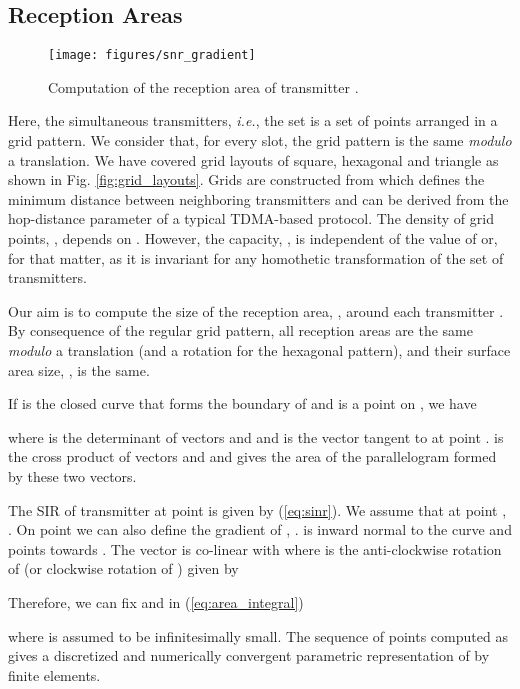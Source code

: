 \documentclass[12pt,english]{article}
\begin{document}
\subsection{Reception Areas}
\label{sec:rx_area_2}

\begin{figure}[!t]
\centering
{}
\texttt{[image: figures/snr\_gradient]}
\caption{Computation of the reception area of transmitter .\label{fig:snr_gradient}}
\end{figure}

Here, the simultaneous transmitters, {\it i.e.}, the set  is a set of points arranged in a grid pattern. We consider that, for every slot, the grid pattern is the same {\em modulo} a translation. We have covered grid layouts of square, hexagonal and triangle as shown in Fig. \ref{fig:grid_layouts}. Grids are constructed from  which defines the minimum distance between neighboring transmitters and can be derived from the hop-distance parameter of a typical TDMA-based protocol. The density of grid points, , depends on . However, the capacity, , is independent of the value of  or, for that matter,  as it is invariant for any homothetic transformation of the set of transmitters. 

Our aim is to compute the size of the reception area, , around each transmitter . By consequence of the regular grid pattern, all reception areas are the same {\em modulo} a translation (and a rotation for the hexagonal pattern), and their surface area size, , is the same.  

If  is the closed curve that forms the boundary of  and  is a point on , we have

where  is the determinant of vectors  and  and  is the vector tangent to  at point . \mbox{} is the cross product of vectors  and  and gives the area of the parallelogram formed by these two vectors. 

The SIR  of transmitter  at point  is given by (\ref{eq:sinr}).
We assume that at point , . On point  we can also define the gradient of , .
 is inward normal to the curve  and points towards . The vector  is co-linear with  where  is the anti-clockwise rotation of  (or clockwise rotation of ) given by
 
Therefore, we can fix  and in (\ref{eq:area_integral}) 

where  is assumed to be infinitesimally small. The sequence of points  computed as 
 gives a discretized and numerically convergent parametric representation of  by finite elements. 
\end{document}
